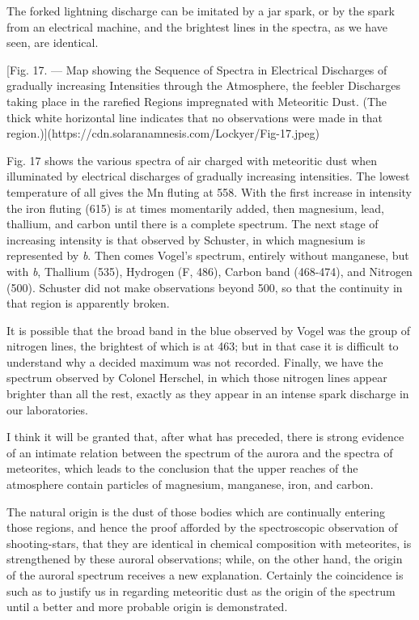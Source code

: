 \documentclass[a4paper, 12pt, oneside, polutonikogreek, english]{article}
\begin{document}
The forked lightning discharge can be imitated by a jar spark, or by the spark from an electrical machine, and the brightest lines in the spectra, as we have seen, are identical.

[Fig. 17. --- Map showing the Sequence of Spectra in Electrical Discharges of gradually increasing Intensities through the Atmosphere, the feebler Discharges taking place in the rarefied Regions impregnated with Meteoritic Dust. (The thick white horizontal line indicates that no observations were made in that region.)](https://cdn.solaranamnesis.com/Lockyer/Fig-17.jpeg)

Fig. 17 shows the various spectra of air charged with meteoritic dust when illuminated by electrical discharges of gradually increasing intensities. The lowest temperature of all gives the Mn fluting at 558. With the first increase in intensity the iron fluting (615) is at times momentarily added, then magnesium, lead, thallium, and carbon until there is a complete spectrum. The next stage of increasing intensity is that observed by Schuster, in which magnesium is represented by \emph{b}. Then comes Vogel's spectrum, entirely without manganese, but with \emph{b}, Thallium (535), Hydrogen (F, 486), Carbon band (468-474), and Nitrogen (500). Schuster did not make observations beyond 500, so that the continuity in that region is apparently broken.

It is possible that the broad band in the blue observed by Vogel was the group of nitrogen lines, the brightest of which is at 463; but in that case it is difficult to understand why a decided maximum was not recorded. Finally, we have the spectrum observed by Colonel Herschel, in which those nitrogen lines appear brighter than all the rest, exactly as they appear in an intense spark discharge in our laboratories.

I think it will be granted that, after what has preceded, there is strong evidence of an intimate relation between the spectrum of the aurora and the spectra of meteorites, which leads to the conclusion that the upper reaches of the atmosphere contain particles of magnesium, manganese, iron, and carbon.

The natural origin is the dust of those bodies which are continually entering those regions, and hence the proof afforded by the spectroscopic observation of shooting-stars, that they are identical in chemical composition with meteorites, is strengthened by these auroral observations; while, on the other hand, the origin of the auroral spectrum receives a new explanation. Certainly the coincidence is such as to justify us in regarding meteoritic dust as the origin of the spectrum until a better and more probable origin is demonstrated.
\end{document}
